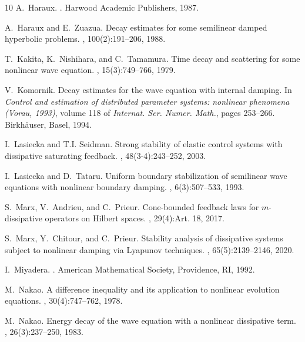 \documentclass[11pt, a4paper]{amsart}
\theoremstyle{definition}
\numberwithin{equation}{section}
\begin{document}
\begin{thebibliography}{10}
A.~Haraux.
.
\newblock Harwood Academic Publishers, 1987.

A.~Haraux and E.~Zuazua.
\newblock Decay estimates for some semilinear damped hyperbolic problems.
, 100(2):191--206, 1988.

T.~Kakita, K.~Nishihara, and C.~Tamamura.
\newblock Time decay and scattering for some nonlinear wave equation.
, 15(3):749--766, 1979.

V.~Komornik.
\newblock Decay estimates for the wave equation with internal damping.
\newblock In {\em Control and estimation of distributed parameter systems:
  nonlinear phenomena ({V}orau, 1993)}, volume 118 of {\em Internat. Ser.
  Numer. Math.}, pages 253--266. Birkh\"auser, Basel, 1994.

I.~Lasiecka and T.I. Seidman.
\newblock Strong stability of elastic control systems with dissipative
  saturating feedback.
, 48(3-4):243--252, 2003.

I.~Lasiecka and D.~Tataru.
\newblock Uniform boundary stabilization of semilinear wave equations with
  nonlinear boundary damping.
, 6(3):507--533, 1993.

S.~Marx, V.~Andrieu, and C.~Prieur.
\newblock Cone-bounded feedback laws for {$m$}-dissipative operators on
  {H}ilbert spaces.
, 29(4):Art. 18, 2017.

S.~Marx, Y.~Chitour, and C.~Prieur.
\newblock Stability analysis of dissipative systems subject to nonlinear
  damping via {L}yapunov techniques.
, 65(5):2139--2146, 2020.

I.~Miyadera.
.
\newblock American Mathematical Society, Providence, RI, 1992.

M.~Nakao.
\newblock A difference inequality and its application to nonlinear evolution
  equations.
, 30(4):747--762, 1978.

M.~Nakao.
\newblock Energy decay of the wave equation with a nonlinear dissipative term.
, 26(3):237--250, 1983.


\end{thebibliography}
\end{document}
